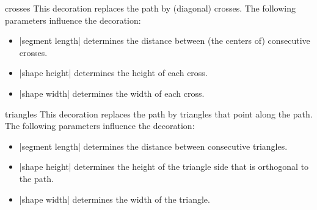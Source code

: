 \begin{decoration}{crosses}
  This decoration replaces the path by (diagonal) crosses. The
  following parameters influence the decoration:
  \begin{itemize}
  \item |segment length|
    determines the distance between (the centers of) consecutive crosses.
  \item |shape height|
    determines the height of each cross.
  \item |shape width|
    determines the width of each cross.
  \end{itemize}
\begin{codeexample}[]
\end{codeexample}
\end{decoration}

\begin{decoration}{triangles}
  This decoration replaces the path by triangles that point along the
  path. The following parameters influence the decoration:
  \begin{itemize}
  \item |segment length|
    determines the distance between consecutive triangles.
  \item |shape height|
    determines the height of the triangle side that is orthogonal
    to the path.
  \item |shape width|
    determines the width of the triangle.
  \end{itemize}
\begin{codeexample}[]
\end{codeexample}
\end{decoration}



